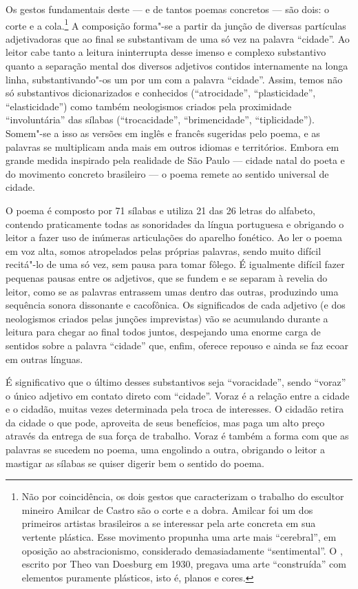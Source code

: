 Os gestos fundamentais deste --- e de tantos poemas concretos --- são
dois: o corte e a cola.\footnote{Não por coincidência, os dois gestos
  que caracterizam o trabalho do escultor mineiro Amilcar de Castro são
  o corte e a dobra. Amilcar foi um dos primeiros artistas brasileiros a
  se interessar pela arte concreta em sua vertente plástica. Esse
  movimento propunha uma arte mais ``cerebral'', em oposição ao
  abstracionismo, considerado demasiadamente ``sentimental''. O
  {}, escrito por Theo van Doesburg em 1930,
  pregava uma arte ``construída'' com elementos puramente plásticos,
  isto é, planos e cores.} A composição forma"-se a partir da junção de
diversas partículas adjetivadoras que ao final se substantivam de uma só
vez na palavra ``cidade''. Ao leitor cabe tanto a leitura ininterrupta
desse imenso e complexo substantivo quanto a separação mental dos
diversos adjetivos contidos internamente na longa linha,
substantivando"-os um por um com a palavra ``cidade''. Assim, temos não
só substantivos dicionarizados e conhecidos (``atrocidade'',
``plasticidade'', ``elasticidade'') como também neologismos criados pela
proximidade ``involuntária'' das sílabas (``trocacidade'',
``brimencidade'', ``tiplicidade''). Somem"-se a isso as versões em inglês
e francês sugeridas pelo poema, e as palavras se multiplicam anda
mais em outros idiomas e territórios. Embora em grande medida inspirado
pela realidade de São Paulo --- cidade natal do poeta e do movimento
concreto brasileiro --- o poema remete ao sentido universal de cidade.

O poema é composto por 71 sílabas e utiliza 21 das 26 letras do
alfabeto, contendo praticamente todas as sonoridades da língua
portuguesa e obrigando o leitor a fazer uso de inúmeras articulações do
aparelho fonético. Ao ler o poema em voz alta, somos atropelados pelas
próprias palavras, sendo muito difícil recitá"-lo de uma só vez, sem
pausa para tomar fôlego. É igualmente difícil fazer pequenas pausas
entre os adjetivos, que se fundem e se separam à revelia do leitor, como
se as palavras entrassem umas dentro das outras, produzindo uma
sequência sonora dissonante e cacofônica. Os significados de cada
adjetivo (e dos neologismos criados pelas junções imprevistas) vão se
acumulando durante a leitura para chegar ao final todos juntos,
despejando uma enorme carga de sentidos sobre a palavra ``cidade'' que,
enfim, oferece repouso e ainda se faz ecoar em outras línguas.

É significativo que o último desses substantivos seja ``voracidade'',
sendo ``voraz'' o único adjetivo em contato direto com ``cidade''. Voraz
é a relação entre a cidade e o cidadão, muitas vezes determinada pela
troca de interesses. O cidadão retira da cidade o que pode, aproveita de
seus benefícios, mas paga um alto preço através da entrega de sua força
de trabalho. Voraz é também a forma com que as palavras se sucedem no
poema, uma engolindo a outra, obrigando o leitor a mastigar as sílabas
se quiser digerir bem o sentido do poema.

